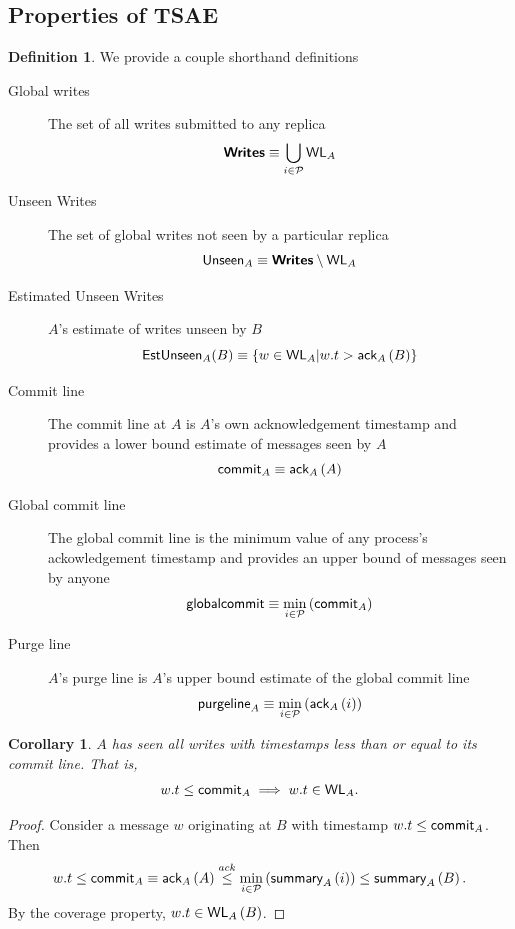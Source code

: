 \documentclass[]             %
{NASA}                       %
\newtheorem{corollary}{Corollary}[theorem]
\theoremstyle{definition}
\newtheorem{definition}{Definition}[section]
\begin{document}
\clearpage


\subsection{Properties of TSAE}

\begin{definition}
  We provide a couple shorthand definitions
\begin{description}
  \item[Global writes] The set of all writes submitted to any replica
    \[ \textbf{\textsf{Writes}} \equiv \bigcup_{i \in \mathcal{P}} \textsf{WL}_{A}\]
  \item[Unseen Writes] The set of global writes not seen by a particular replica
    \[\textsf{Unseen}_{A} \equiv \textbf{\textsf{Writes}} \setminus \textsf{WL}_{A} \]
  \item[Estimated Unseen Writes] $A$'s estimate of writes unseen by $B$
    \[\textsf{EstUnseen}_{A}{\left(B\right)} \equiv \{w \in \textsf{WL}_{A} | w.t > \textsf{ack}_{A}\left(B\right) \} \]
  \item[Commit line] The commit line at $A$ is $A$'s own
    acknowledgement timestamp and provides a lower bound estimate of
    messages seen by $A$
    \[\textsf{commit}_{A} \equiv \textsf{ack}_{A}\left(A\right)\]
  \item[Global commit line] The global commit line is the minimum
    value of any process's ackowledgement timestamp and provides an
    upper bound of messages seen by anyone
    \[ \textsf{globalcommit} \equiv \min_{i \in \mathcal{P}} \left( \textsf{commit}_{A} \right) \]
  \item[Purge line] $A$'s purge line is $A$'s upper bound estimate of the global commit line
    \[ \textsf{purgeline}_{A} \equiv \min_{i \in \mathcal{P}} \left( \textsf{ack}_{A}\left(i\right) \right) \]
  \end{description}
\end{definition}



\begin{corollary}
  \label{cor:commitline}
  $A$ has seen all writes with timestamps less than or equal to its commit line. That is,
  \[w.t \leq \textsf{commit}_{A} \implies w.t \in \textsf{WL}_{A}.\]
\end{corollary}
\begin{proof}
  Consider a message $w$ originating at $B$ with timestamp $w.t \leq \textsf{commit}_{A}$.
  Then \[w.t \leq  \textsf{commit}_{A} \equiv \textsf{ack}_{A}\left(A\right) \overset{ack}{\leq} \min_{i \in \mathcal{P}}\left(\textsf{summary}_{A}\left(i\right)\right) \leq \textsf{summary}_{A}\left(B\right).\]
  By the coverage property, $w.t \in \textsf{WL}_{A}\left(B\right)$.
\end{proof}
\end{document}
